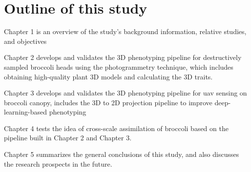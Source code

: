 \section{Outline of this study}

Chapter 1 is an overview of the study's background information, relative studies, and objectives

Chapter 2 develops and validates the 3D phenotyping pipeline for destructively sampled broccoli heads using the photogrammetry technique, which includes obtaining high-quality plant 3D models and calculating the 3D traits.


Chapter 3 develops and validates the 3D phenotyping pipeline for \gls{uav} sensing on broccoli canopy, includes the 3D to 2D projection pipeline to improve deep-learning-based phenotyping

Chapter 4 tests the idea of cross-scale assimilation of broccoli based on the pipeline built in Chapter 2 and Chapter 3.

Chapter 5 summarizes the general conclusions of this study, and also discusses the research prospects in the future.